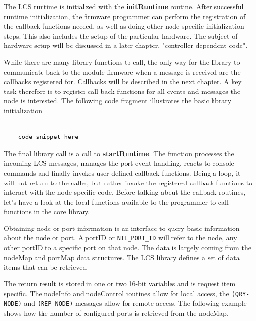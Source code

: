 
The LCS runtime is initialized with the \textbf{initRuntime} routine. After successful runtime initialization, the firmware programmer can perform the registration of the callback functions needed, as well as doing other node specific initialization steps. This also includes the setup of the particular hardware. The subject of hardware setup will be discussed in a later chapter, "controller dependent code". 

While there are many library functions to call, the only way for the library to communicate back to the module firmware when a message is received are the callbacks registered for. Callbacks will be described in the next chapter. A key task therefore is to register call back functions for all events and messages the node is interested. The following code fragment illustrates the basic library initialization.

\lstset{language=c++, style=codesnippetstyle}
\begin{lstlisting}
   
    code snippet here

\end{lstlisting}
\FloatBarrier


The final library call is a call to \textbf{startRuntime}. The function processes the incoming LCS messages, manages the port event handling, reacts to console commands and finally invokes user defined callback functions. Being a loop, it will not return to the caller, but rather invoke the registered callback functions to interact with the node specific code. Before talking about the callback routines, let's have a look at the local functions available to the  programmer to call functions in the core library.


Obtaining node or port information is an interface to query basic information about the node or port. A portID or \texttt{NIL\_PORT\_ID} will refer to the node, any other portID to a specific port on that node. The data is largely coming from the nodeMap and portMap data structures. The LCS library defines a set of data items that can be retrieved. 

The return result is stored in one or two 16-bit variables and is request item specific. The nodeInfo and nodeControl routines allow for local access, the \texttt{(QRY-NODE)} and \texttt{(REP-NODE)} messages allow for remote access. The following example shows how the number of configured ports is retrieved from the nodeMap.


